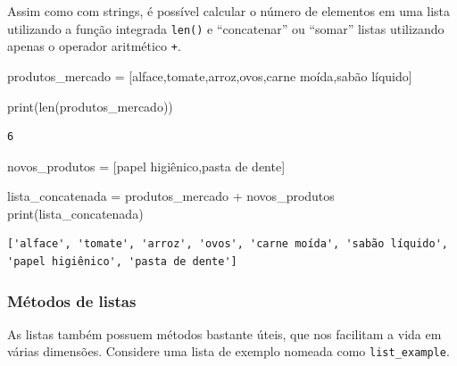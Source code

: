 \documentclass[
  brazilian,
  letterpaper,
  DIV=11,
  numbers=noendperiod]{scrreprt}
\newenvironment{Shaded}{\begin{snugshade}}{\end{snugshade}}
\newcommand{\BuiltInTok}[1]{\textcolor[rgb]{0.00,0.23,0.31}{#1}}
\newcommand{\NormalTok}[1]{\textcolor[rgb]{0.00,0.23,0.31}{#1}}
\newcommand{\OperatorTok}[1]{\textcolor[rgb]{0.37,0.37,0.37}{#1}}
\newcommand{\StringTok}[1]{\textcolor[rgb]{0.13,0.47,0.30}{#1}}
\begin{document}
Assim como com strings, é possível calcular o número de elementos em uma
lista utilizando a função integrada \texttt{len()} e ``concatenar'' ou
``somar'' listas utilizando apenas o operador aritmético \texttt{+}.

\begin{Shaded}
\begin{Highlighting}[]
\NormalTok{produtos\_mercado }\OperatorTok{=}\NormalTok{ [}\StringTok{\textquotesingle{}alface\textquotesingle{}}\NormalTok{,}\StringTok{\textquotesingle{}tomate\textquotesingle{}}\NormalTok{,}\StringTok{\textquotesingle{}arroz\textquotesingle{}}\NormalTok{,}\StringTok{\textquotesingle{}ovos\textquotesingle{}}\NormalTok{,}\StringTok{\textquotesingle{}carne moída\textquotesingle{}}\NormalTok{,}\StringTok{\textquotesingle{}sabão líquido\textquotesingle{}}\NormalTok{]}

\BuiltInTok{print}\NormalTok{(}\BuiltInTok{len}\NormalTok{(produtos\_mercado))}
\end{Highlighting}
\end{Shaded}

\begin{verbatim}
6
\end{verbatim}

\begin{Shaded}
\begin{Highlighting}[]
\NormalTok{novos\_produtos }\OperatorTok{=}\NormalTok{ [}\StringTok{\textquotesingle{}papel higiênico\textquotesingle{}}\NormalTok{,}\StringTok{\textquotesingle{}pasta de dente\textquotesingle{}}\NormalTok{]}

\NormalTok{lista\_concatenada }\OperatorTok{=}\NormalTok{ produtos\_mercado }\OperatorTok{+}\NormalTok{ novos\_produtos}
\BuiltInTok{print}\NormalTok{(lista\_concatenada)}
\end{Highlighting}
\end{Shaded}

\begin{verbatim}
['alface', 'tomate', 'arroz', 'ovos', 'carne moída', 'sabão líquido', 'papel higiênico', 'pasta de dente']
\end{verbatim}

\subsubsection{Métodos de listas}\label{muxe9todos-de-listas}

As listas também possuem métodos bastante úteis, que nos facilitam a
vida em várias dimensões. Considere uma lista de exemplo nomeada como
\texttt{list\_example}.
\end{document}
